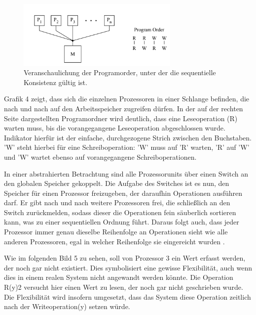 \documentclass[final,bibliography=totocnumbered]{include/sikseminar}
\begin{document}
\begin{figure}[htbp] %
  \centering
  \includegraphics[width=0.7\textwidth]{figures/seqq}
  \caption{Veranschaulichung der Programorder, unter der die sequentielle Konsistenz gültig ist\cite{mcm3}.}
  \label{Fig:seqq}
\end{figure}
Grafik 4 zeigt, dass sich die einzelnen Prozessoren in einer Schlange befinden, die nach und nach auf den Arbeitsspeicher zugreifen dürfen.
In der auf der rechten Seite dargestellten Programordner wird deutlich, dass eine Leseoperation (R) warten muss, bis die vorangegangene Leseoperation abgeschlossen wurde. Indikator hierfür ist der einfache, durchgezogene Strich zwischen den Buchstaben.
'W' steht hierbei für eine Schreiboperation\cite{designingmcm}: 'W' muss auf 'R' warten, 'R' auf 'W' und 'W' wartet ebenso auf vorangegangene Schreiboperationen.  

In einer abstrahierten Betrachtung sind alle Prozessorunits über einen Switch an den globalen Speicher gekoppelt. Die Aufgabe des Switches ist es nun, den Speicher für einen Prozessor freizugeben, der daraufhin Operationen ausführen darf.
Er gibt nach und nach weitere Prozessoren frei, die schließlich an den Switch zurückmelden, sodass dieser die Operationen fein säuberlich sortieren kann, was zu einer sequentiellen Ordnung führt. 
Daraus folgt auch, dass jeder Prozessor immer genau dieselbe Reihenfolge an Operationen sieht wie alle anderen Prozessoren, egal in welcher Reihenfolge sie eingereicht wurden \cite{smcmtutorial}.

Wie im folgenden Bild 5 zu sehen, soll von Prozessor 3 ein Wert erfasst werden, der noch gar nicht existiert. Dies symbolisiert eine gewisse Flexibilität, auch wenn dies in einem realen System nicht angewandt werden könnte. Die Operation R(y)2 versucht hier einen Wert zu lesen, der noch gar nicht geschrieben wurde. Die Flexibilität wird insofern umgesetzt, dass 
das System diese Operation zeitlich nach der Writeoperation(y) setzen würde.
\end{document}
